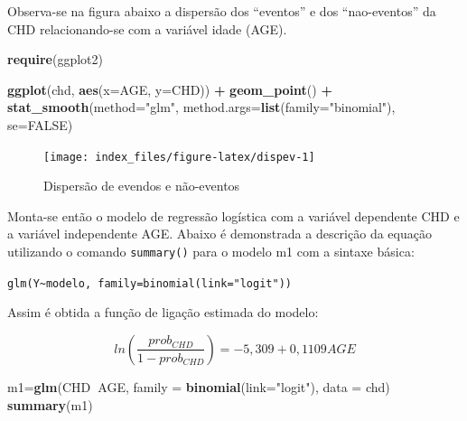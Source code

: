\documentclass[12pt,brazil,oneside]{book}
\newenvironment{Shaded}{\begin{snugshade}}{\end{snugshade}}
\newcommand{\DataTypeTok}[1]{\textcolor[rgb]{0.13,0.29,0.53}{#1}}
\newcommand{\KeywordTok}[1]{\textcolor[rgb]{0.13,0.29,0.53}{\textbf{#1}}}
\newcommand{\NormalTok}[1]{#1}
\newcommand{\OperatorTok}[1]{\textcolor[rgb]{0.81,0.36,0.00}{\textbf{#1}}}
\newcommand{\OtherTok}[1]{\textcolor[rgb]{0.56,0.35,0.01}{#1}}
\newcommand{\StringTok}[1]{\textcolor[rgb]{0.31,0.60,0.02}{#1}}
\begin{document}
Observa-se na figura abaixo a dispersão dos ``eventos'' e dos
``nao-eventos'' da CHD relacionando-se com a variável idade (AGE).

\begin{Shaded}
\begin{Highlighting}[]
\KeywordTok{require}\NormalTok{(ggplot2)}

\KeywordTok{ggplot}\NormalTok{(chd, }\KeywordTok{aes}\NormalTok{(}\DataTypeTok{x=}\NormalTok{AGE, }\DataTypeTok{y=}\NormalTok{CHD)) }\OperatorTok{+}\StringTok{ }
\StringTok{  }\KeywordTok{geom_point}\NormalTok{() }\OperatorTok{+}\StringTok{ }
\StringTok{  }\KeywordTok{stat_smooth}\NormalTok{(}\DataTypeTok{method=}\StringTok{"glm"}\NormalTok{, }\DataTypeTok{method.args=}\KeywordTok{list}\NormalTok{(}\DataTypeTok{family=}\StringTok{"binomial"}\NormalTok{), }\DataTypeTok{se=}\OtherTok{FALSE}\NormalTok{)}
\end{Highlighting}
\end{Shaded}

\begin{figure}[H]

{\centering \texttt{[image: index\_files/figure-latex/dispev-1]} 

}

\caption{Dispersão de evendos e não-eventos}\label{fig:dispev}
\end{figure}

Monta-se então o modelo de regressão logística com a variável dependente
CHD e a variável independente AGE. Abaixo é demonstrada a descrição da
equação utilizando o comando \texttt{summary()} para o modelo m1 com a
sintaxe básica:

\texttt{glm(Y\textasciitilde{}modelo,\ family=binomial(link="logit"))}

Assim é obtida a função de ligação estimada do modelo:

\[
ln\left (\frac{prob_{CHD}}{1-prob_{CHD}}  \right ) = - 5,309 + 0,1109AGE
\]

\begin{Shaded}
\begin{Highlighting}[]
\NormalTok{m1=}\KeywordTok{glm}\NormalTok{(CHD}\OperatorTok{~}\NormalTok{AGE, }\DataTypeTok{family =} \KeywordTok{binomial}\NormalTok{(}\DataTypeTok{link=}\StringTok{"logit"}\NormalTok{), }\DataTypeTok{data =}\NormalTok{ chd)}
\KeywordTok{summary}\NormalTok{(m1)}
\end{Highlighting}
\end{Shaded}
\end{document}
